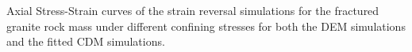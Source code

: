 \label{fig:fitted2} Axial Stress-Strain curves of the strain reversal simulations for the fractured granite rock mass under different confining stresses for both the DEM simulations and the fitted CDM simulations.